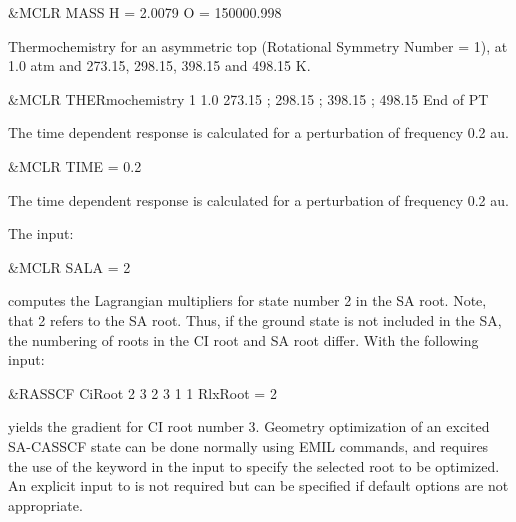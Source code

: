 \begin{inputlisting}
 &MCLR
MASS
H   = 2.0079
O   = 150000.998
\end{inputlisting}

Thermochemistry for an asymmetric top (Rotational Symmetry Number
 = 1), at 1.0 atm and 273.15, 298.15, 398.15 and 498.15 K.
\begin{inputlisting}
 &MCLR
THERmochemistry
 1
 1.0
 273.15 ;  298.15 ;  398.15 ;  498.15
End of PT
\end{inputlisting}

The time dependent response is calculated for a perturbation of frequency
0.2 au.

\begin{inputlisting}
 &MCLR
TIME = 0.2
\end{inputlisting}
The time dependent response is calculated for a perturbation of frequency
0.2 au.

The input:
\begin{inputlisting}
 &MCLR
SALA  = 2
\end{inputlisting}
computes the Lagrangian multipliers for state number 2 in the SA root.
Note, that 2 refers to the SA root. Thus, if the ground state is not
included in the SA, the numbering of roots in the CI root and SA root
differ. With the following  input:
\begin{inputlisting}
 &RASSCF
CiRoot
 2 3
 2 3
 1 1
RlxRoot = 2
\end{inputlisting}
 yields the gradient for CI root number 3. Geometry optimization
of an excited SA-CASSCF state can be done normally using EMIL commands,
and requires the use of the  keyword in the 
input to specify the selected root to be optimized. An explicit input
to  is not required but can be specified if default options
are not appropriate.



